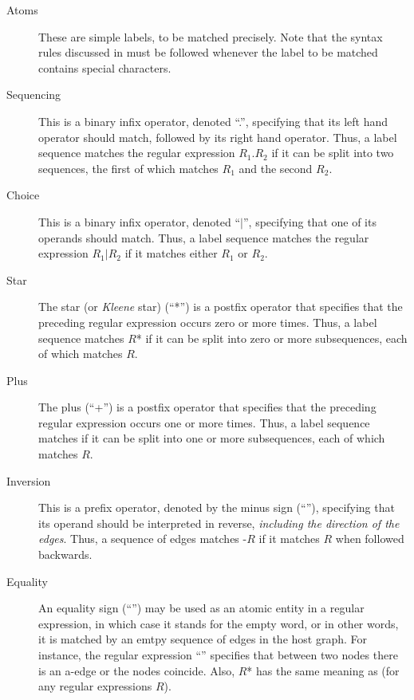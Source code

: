 \begin{description}
\item[Atoms] These are simple labels, to be matched precisely. Note that the
  syntax rules discussed in  must be followed whenever the label
  to be matched contains special characters.

\item[Sequencing] This is a binary infix operator, denoted ``\textsf{.}'',
  specifying that its left hand operator should match, followed by its right
  hand operator. Thus, a label sequence matches the regular expression
  \textsf{$R_1$.$R_2$} if it can be split into two sequences, the first of
  which matches $R_1$ and the second $R_2$.

\item[Choice] This is a binary infix operator, denoted ``\textsf{$|$}'',
  specifying that one of its operands should match. Thus, a label sequence
  matches the regular expression \textsf{$R_1|R_2$} if it matches either
  $R_1$ or $R_2$.

\item[Star] The star (or \emph{Kleene} star) (``\textsf{*}'') is a postfix
  operator that specifies that the preceding regular expression occurs zero or
  more times. Thus, a label sequence matches \textsf{$R$*} if it can be split
  into zero or more subsequences, each of which matches $R$.

\item[Plus] The plus (``\textsf{+}'') is a postfix operator that specifies that
  the preceding regular expression occurs one or more times. Thus, a label
  sequence matches  if it can be split into one or more
  subsequences, each of which matches $R$.

\item[Inversion] This is a prefix operator, denoted by the minus sign
  (``\lab{-}''), specifying that its operand should be interpreted in
  reverse, \emph{including the direction of the edges}. Thus, a sequence of
  edges matches \textsf{-$R$} if it matches $R$ when followed backwards.

\item[Equality] An equality sign (``\lab{=}'') may be used as an atomic
  entity in a regular expression, in which case it stands for the empty word,
  or in other words, it is matched by an emtpy sequence of edges in the host
  graph. For instance, the regular expression ``'' specifies that
  between two nodes there is an \textsf{a}-edge or the nodes coincide. Also,
  \textsf{$R$*} has the same meaning as  (for any regular
  expressions $R$).


\end{description}

